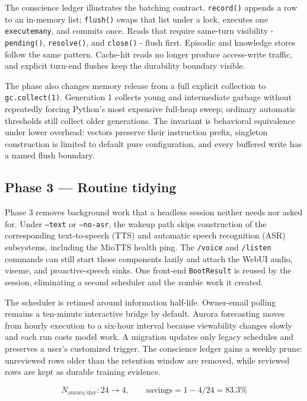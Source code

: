 \documentclass[11pt]{article}
\begin{document}
The conscience ledger illustrates the batching contract. \texttt{record()} appends a row to an in-memory list; \texttt{flush()} swaps that list under a lock, executes one \texttt{executemany}, and commits once. Reads that require same-turn visibility - \texttt{pending()}, \texttt{resolve()}, and \texttt{close()} - flush first. Episodic and knowledge stores follow the same pattern. Cache-hit reads no longer produce access-write traffic, and explicit turn-end flushes keep the durability boundary visible.

The phase also changes memory release from a full explicit collection to \texttt{gc.collect(1)}. Generation 1 collects young and intermediate garbage without repeatedly forcing Python's most expensive full-heap sweep; ordinary automatic thresholds still collect older generations. The invariant is behavioral equivalence under lower overhead: vectors preserve their instruction prefix, singleton construction is limited to default pure configuration, and every buffered write has a named flush boundary.

\subsection{Phase 3 — Routine tidying}

Phase 3 removes background work that a headless session neither needs nor asked for. Under \texttt{--text} or \texttt{--no-asr}, the wakeup path skips construction of the corresponding text-to-speech (TTS) and automatic speech recognition (ASR) subsystems, including the MioTTS health ping. The \texttt{/voice} and \texttt{/listen} commands can still start those components lazily and attach the WebUI audio, viseme, and proactive-speech sinks. One front-end \texttt{BootResult} is reused by the session, eliminating a second scheduler and the zombie work it created.

The scheduler is retimed around information half-life. Owner-email polling remains a ten-minute interactive bridge by default. Aurora forecasting moves from hourly execution to a six-hour interval because viewability changes slowly and each run costs model work. A migration updates only legacy schedules and preserves a user's customized trigger. The conscience ledger gains a weekly prune: unreviewed rows older than the retention window are removed, while reviewed rows are kept as durable training evidence.

\begin{equation}
N_{\mathrm{aurora/day}}:24\longrightarrow4,\qquad \mathrm{savings}=1-4/24=83.3\%
\tag{3}
\end{equation}
\end{document}
